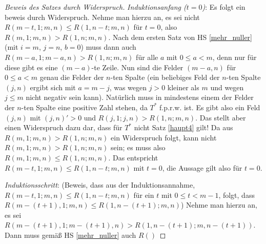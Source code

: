 \begin{proof}[Beweis des Satzes durch Widerspruch]
    \textit{Induktionsanfang ($t=0$)}: Es folgt ein beweis durch Widerspruch. Nehme man hierzu an, es sei nicht 
    $R(m-t, 1; m, n)\leq R(1, n-t; m, n)$ für $t=0$, also $R(m, 1; m, n)>R(1, n; m, n)$. Nach dem ersten Satz von 
    HS \ref{mehr_nuller} (mit $i=m$, $j=n$, $b=0$) muss dann auch $R(m-a, 1; m-a, n) > R(1, n; m, n)$ für alle 
    $a$ mit $0\leq a<m$, denn nur für diese gibt es eine $(m-a)$-te Zeile. Nun sind die Felder $(m-a, n)$ für $0\leq 
    a<m$ genau die Felder der $n$-ten Spalte (ein beliebiges Feld der $n$-ten Spalte $(j, n)$ ergibt sich mit $a=m-j$, 
    was wegen $j>0$ kleiner als $m$ und wegen $j\leq m$ nicht negativ sein kann). Natürlich muss in mindestens einem 
    der Felder der $n$-ten Spalte eine positive Zahl stehen, da $T^*$ f.p.r.w. ist. Es gibt also ein Feld $(j, n)$ 
    mit $(j, n)'>0$ und $R(j, 1; j, n)>R(1, n; m, n)$. Das stellt aber einen Widerspruch dazu dar, dass für $T^*$ nicht 
    Satz \ref{haupt4} gilt! Da aus $R(m, 1; m, n)>R(1, n; m, n)$ ein Widerspruch folgt, kann nicht $R(m, 1; m, n)>
    R(1, n; m, n)$ sein; es muss also $R(m, 1; m, n)\leq R(1, n; m, n)$. Das entspricht $R(m-t, 1; m, n)\leq 
    R(1, n-t; m, n)$ mit $t=0$, die Aussage gilt also für $t=0$.


    \textit{Induktionsschritt}: (Beweis, dass aus der Induktionsannahme, $R(m-t, 1; m, n)\leq R(1, n-t; m, n)$ für 
    ein $t$ mit $0\leq t<m-1$, folgt, dass $R(m-(t+1), 1; m, n)\leq R(1, n-(t+1); m, n)$) Nehme man hierzu an, es sei 
    $R(m-(t+1), 1; m-(t+1), n)>R(1, n-(t+1); m, n-(t+1))$. Dann muss gemäß HS \ref{mehr_nuller} auch 
    $R()$





\end{proof}
